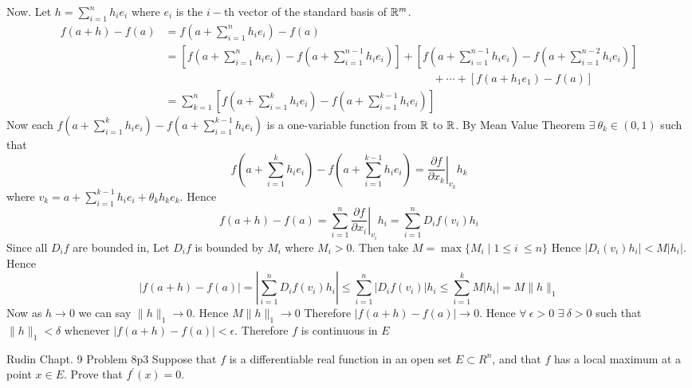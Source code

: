 \documentclass[a4paper, 11pt]{article}
\begin{document}
{		Now. Let $h=\sum\limits_{i=1}^n h_ie_i$ where $e_i$ is the $i-$th vector of the standard basis of $\mathbb{R}^m$. \begin{align*}
		f(a+h)-f(a) & =f\left(a+\sum_{i=1}^nh_ie_i\right)-f(a)                                                                                                                                                                                                      \\
		            & =\left[f\left(a+\sum_{i=1}^nh_ie_i\right)-f\left(a+\sum_{i=1}^{n-1}h_ie_i\right)\right]+\left[f\left(a+\sum_{i=1}^{n-1}h_ie_i\right)-f\left(a+\sum_{i=1}^{n-2}h_ie_i\right)\right]\\
		            & \qquad\qquad\qquad\qquad\qquad\qquad\qquad\qquad\qquad\qquad\qquad\qquad+\cdots+\left[f\left(a+h_1e_1\right)-f\left(a\right)\right] \\
		            & =\sum_{k=1}^n\left[f\left(a+\sum_{i=1}^kh_ie_i\right)-f\left(a+\sum_{i=1}^{k-1}h_ie_i\right)\right]
	\end{align*} Now each $f\left(a+\sum\limits_{i=1}^kh_ie_i\right)-f\left(a+\sum\limits_{i=1}^{k-1}h_ie_i\right)$ is a one-variable function from $\mathbb{R}$ to $\mathbb{R}$. By Mean Value Theorem $\exists \ \theta_k\in \left(0,1\right)$ such that $$f\left(a+\sum\limits_{i=1}^kh_ie_i\right)-f\left(a+\sum\limits_{i=1}^{k-1}h_ie_i\right)=\left.\frac{\partial f}{\partial x_k}\right|_{v_k}h_k$$where $v_k= a+\sum\limits_{i=1}^{k-1} h_ie_i+\theta_k h_k e_k$. Hence $$f(a+h)-f(a)=\sum_{i=1}^n \left.\frac{\partial f}{\partial x_i}\right|_{v_i}h_i=\sum_{i=1}^nD_if(v_i)h_i$$Since all $D_if$ are bounded in, Let $D_if$ is bounded by $M_i$ where $M_i>0$. Then take $M=\max\{M_i\mid 1\leq i\ \leq n\}$ Hence $\left|D_i(v_i)h_i\right|<M|h_i|$. Hence
	$$|f(a+h)-f(a)|=\left|\sum_{i=1}^nD_if(v_i)h_i\right|\leq \sum_{i=1}^n\left|D_if(v_i)\right|h_i\leq \sum_{i=1}^kM|h_i|=M\|h\|_1$$Now as $h\to 0$ we can say $\|h\|_1\to 0$. Hence $M\|h\|_1\to 0$ Therefore $|f(a+h)-f(a)|\to 0$. Hence $\forall\ \epsilon>0$ $\exists\ \delta>0$ such that $\|h\|_1<\delta$ whenever $|f(a+h)-f(a)|<\epsilon$. Therefore $f$ is continuous in $E$}
	
	
	
	\begin{problem}{Rudin Chapt. 9 Problem 8}{p3%
		}
		Suppose that $f$ is a differentiable real function in an open set $E \subset R^{n}$, and that $f$ has a local maximum at a point $x \in E$. Prove that $f^{\prime}(x)=0$.
	\end{problem}
	
\end{document}
